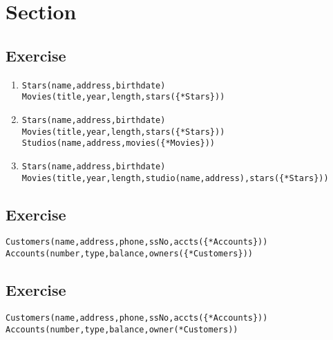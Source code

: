 


\setcounter{section}{3}
\section*{Section \thesection}

\setcounter{subsection}{1}
\subsection*{Exercise \thesubsection}

\begin{enumerate}
\item
\begin{alltt}
Stars(name, address, birthdate)
Movies(title, year, length, stars(\{*Stars\}))
\end{alltt}

\item
\begin{alltt}
Stars(name, address, birthdate)
Movies(title, year, length, stars(\{*Stars\}))
Studios(name, address, movies(\{*Movies\}))
\end{alltt}

\item
\begin{alltt}
Stars(name, address, birthdate)
Movies(title, year, length, studio(name, address), stars(\{*Stars\}))
\end{alltt}

\end{enumerate}


\setcounter{subsection}{2}
\subsection*{Exercise \thesubsection}
\begin{alltt}
Customers(name, address, phone, ssNo, accts(\{*Accounts\}))
Accounts(number, type, balance, owners(\{*Customers\}))
\end{alltt}

\setcounter{subsection}{3}
\subsection*{Exercise \thesubsection}
\begin{alltt}
Customers(name, address, phone, ssNo, accts(\{*Accounts\}))
Accounts(number, type, balance, owner(*Customers))
\end{alltt}

